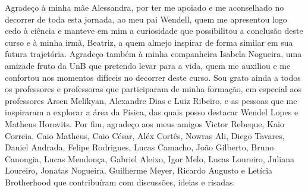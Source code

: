 Agradeço à minha mãe Alessandra, por ter me apoiado e me aconselhado no decorrer
de toda esta jornada, ao meu pai Wendell, quem me apresentou logo cedo à ciência
e manteve em mim a curiosidade que possibilitou a conclusão deste curso e à
minha irmã, Beatriz, a quem almejo inspirar de forma similar em sua futura
trajetória. Agradeço também à minha companheira Isabela Nogueira, uma amizade
fruto da UnB que pretendo levar para a vida, quem me auxiliou e me confortou nos
momentos difíceis no decorrer deste curso. Sou grato ainda a todos os
professores e professoras que participaram de minha formação, em especial aos
professores Arsen Melikyan, Alexandre Dias e Luiz Ribeiro, e as pessoas que me
inspiraram a explorar a área da Física, das quais posso destacar Wendel Lopes e
Matheus Horovits. Por fim, agradeço aos meus amigos Victor Rebeque, Kaio
Correia, Caio Matheus, Caio César, Aléx Cortês, Nowras Ali, Diego Tavares,
Daniel Andrada, Felipe Rodrigues, Lucas Camacho, João Gilberto, Bruno Canongia,
Lucas Mendonça, Gabriel Aleixo, Igor Melo, Lucas Loureiro, Juliana Loureiro,
Jonatas Nogueira, Guilherme Meyer, Ricardo Augusto e Letícia Brotherhood que
contribuíram com discussões, ideias e risadas.
